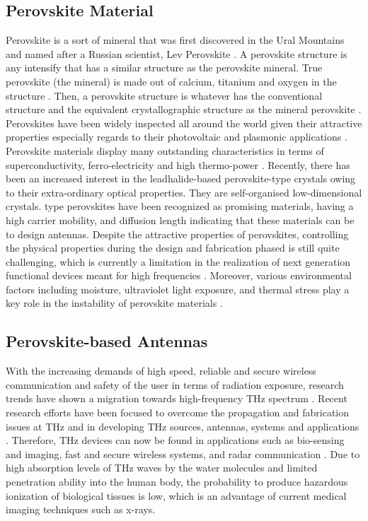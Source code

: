 \documentclass[12pt]{suhbook}
\begin{document}
\subsection{Perovskite Material}
% 
Perovskite is a sort of mineral that was first discovered in the Ural Mountains and named after a Russian scientist, Lev Perovskite  \cite{park2016organic}. A perovskite structure is any intensify that has a similar structure as the perovskite mineral. True perovskite (the mineral) is made out of calcium, titanium and oxygen in the structure . Then, a perovskite structure is whatever has the conventional structure  and the equivalent crystallographic structure as the mineral perovskite \cite{chanana2017colour}. Perovskites have been widely inspected all around the world given their attractive properties especially regards to their photovoltaic and plasmonic applications \cite{song2015perovskite}. Perovskite materials display many outstanding characteristics in terms of superconductivity, ferro-electricity and high thermo-power \cite{kulkarni2012mixed}. Recently, there has been an increased interest in the leadhalide-based perovskite-type crystals owing to their extra-ordinary optical properties. They are self-organised low-dimensional crystals.  type perovskites have been recognized as promising materials, having a high carrier mobility, and diffusion length indicating that these materials can be to design antennas. Despite the attractive properties of perovskites, controlling the physical properties during the design and fabrication phased is still quite challenging, which is currently a limitation in the realization of next generation functional devices meant for high frequencies \cite{ahmad2017instability}. Moreover, various environmental factors including moisture, ultraviolet light exposure, and thermal stress play a key role in the instability of perovskite materials \cite{green2014emergence}.
% 
% 
% 
\subsection{Perovskite-based Antennas}
% 
 With the increasing demands of high speed, reliable and secure wireless communication and safety of the user in terms of radiation exposure, research trends have shown a migration towards high-frequency THz spectrum \cite{ghann2017terahertz,rabbani2017liquid}. Recent research efforts have been focused to overcome the propagation and fabrication issues at THz and in developing THz sources, antennas, systems and applications \cite{siegel2002terahertz}. Therefore, THz devices can now be found in applications such as bio-sensing and imaging, fast and secure wireless systems, and radar communication \cite{ranzani2013g,khatib2018response}. Due to high absorption levels of THz waves by the water molecules and limited penetration ability into the human body, the probability to produce hazardous ionization of biological tissues is low, which is an advantage of current medical imaging techniques such as x-rays. 
 
\end{document}
